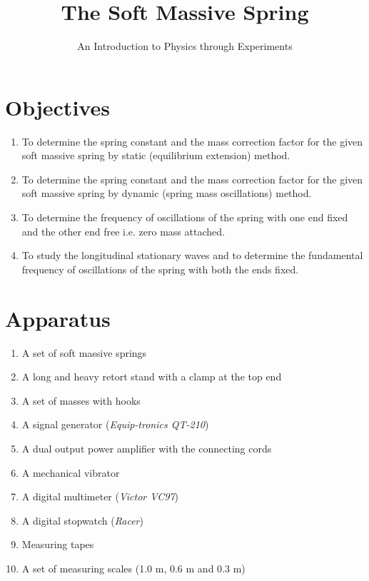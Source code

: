 \title{The Soft Massive Spring}
\author{An Introduction to Physics through Experiments}
\date{}

\maketitle

\section*{Objectives}

\begin{enumerate}
\item To determine the spring constant and the mass correction factor for the given soft massive
spring by static (equilibrium extension) method.
\item To determine the spring constant and the mass correction factor for the given soft massive
spring by dynamic (spring mass oscillations) method.
\item To determine the frequency of oscillations of the spring with one end fixed and the other
end free i.e. zero mass attached.
\item To study the longitudinal stationary waves and to determine the fundamental frequency of
oscillations of the spring with both the ends fixed.
\end{enumerate}

\section*{Apparatus}

\begin{enumerate}[label=\arabic*)]
\itemsep0em
\item A set of soft massive springs
\item A long and heavy retort stand with a clamp at the top end 
\item A set of masses with hooks
\item A signal generator (\textit{Equip-tronics QT-210})
\item A dual output power amplifier with the connecting cords
\item A mechanical vibrator
\item A digital multimeter (\textit{Victor VC97})
\item A digital stopwatch (\textit{Racer})
\item Measuring tapes
\item A set of measuring scales (1.0 m, 0.6 m and 0.3 m)
\end{enumerate}

